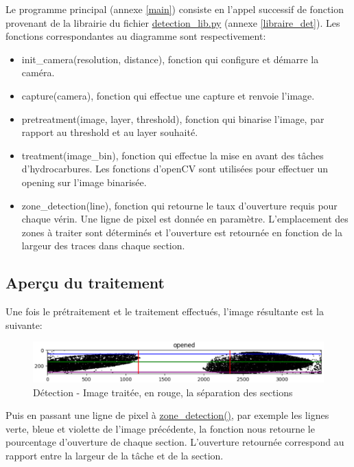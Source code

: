 Le programme principal (annexe \ref{main}) consiste en l'appel successif de fonction provenant de la librairie du fichier \underline{detection\_lib.py} (annexe \ref{libraire_det}).
Les fonctions correspondantes au diagramme sont respectivement:
\begin{itemize}
    \item init\_camera(resolution, distance), fonction qui configure et démarre la caméra.
    \item capture(camera), fonction qui effectue une capture et renvoie l'image.
    \item pretreatment(image, layer, threshold), fonction qui binarise l'image, par rapport au threshold et au layer souhaité.
    \item treatment(image\_bin), fonction qui effectue la mise en avant des tâches d'hydrocarbures. Les fonctions d'openCV sont utilisées pour effectuer un opening sur l'image binarisée.
    \item zone\_detection(line), fonction qui retourne le taux d'ouverture requis pour chaque vérin. Une ligne de pixel est donnée en paramètre. L'emplacement des zones à traiter sont déterminés et l'ouverture est retournée en fonction de la largeur des traces dans chaque section.
\end{itemize}

\subsection{Aperçu du traitement}
Une fois le prétraitement et le traitement effectués, l'image résultante est la suivante:

\begin{figure}[H]
    \centering
    \includegraphics[width=13cm]{assets/figures/traitement1.PNG}
    \caption{Détection - Image traitée, en rouge, la séparation des sections}
\end{figure}

Puis en passant une ligne de pixel à \underline{zone\_detection()}, par exemple les lignes verte, bleue et violette de l'image précédente, la fonction
nous retourne le pourcentage d'ouverture de chaque section. L'ouverture retournée correspond au rapport entre la largeur de la tâche et de la section.

